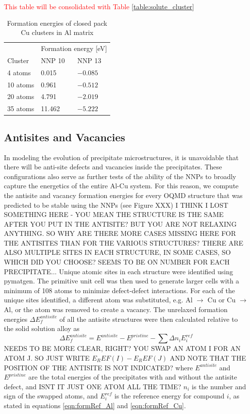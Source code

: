 \documentclass{article}
\begin{document}
\textcolor{red}{This table will be consolidated with Table \ref{table:solute_cluster}}
\begin{table}[H]
 \caption{Formation energies of closed pack Cu clusters in Al matrix}
  \centering
  \begin{tabular}{lll}
    \toprule
    & \multicolumn{2}{c}{Formation energy [eV]}                   \\
    \cmidrule(r){2-3}
    Cluster     & NNP 10     & NNP 13 \\
    \midrule
    4 atoms & 0.015  & $-0.085$     \\
    10 atoms     & 0.961 & $-0.512$      \\
    20 atoms     & 4.791       &  $-2.019$  \\
    35 atoms     & 11.462       &  $-5.222$  \\
    \bottomrule
  \end{tabular}
  \label{tab:cuclust}
\end{table}

\subsection{Antisites and Vacancies} \label{sct:antsite_results}

In modeling the evolution of precipitate microstructures, it is unavoidable that there will be anti-site defects and vacancies inside the precipitates.  These configurations also serve as further tests of the ability of the NNPs to broadly capture the energetics of the entire Al-Cu system.
For this reason, we compute the antisite and vacancy formation energies for every OQMD structure that was predicted to be stable using the NNPs (see Figure XXX) I THINK I LOST SOMETHING HERE - YOU MEAN THE STRUCTURE IS THE SAME AFTER YOU PUT IN THE ANTISITE?  BUT YOU ARE NOT RELAXING ANYTHING. SO WHY ARE THERE MORE CASES MISSING HERE FOR THE ANTISITES THAN FOR THE VARIOUS STRUCTURES?  THERE ARE ALSO MULTIPLE SITES IN EACH STRUCTURE, IN SOME CASES, SO WHICH DID YOU CHOOSE?  SEEMS TO BE ON NUMBER FOR EACH PRECIPITATE...
Unique atomic sites in each structure were identified using pymatgen.
The primitive unit cell was then used to generate larger cells with a minimum of 108 atoms to minimize defect-defect interactions.
For each of the unique sites identified, a different atom was substituted, e.g. Al $\rightarrow$ Cu or Cu $\rightarrow$ Al, or the atom was removed to create a vacancy.  The unrelaxed formation energies $\Delta E^{antisite}_f$ of all the antisite structures were then calculated relative to the solid solution alloy as
\begin{equation}
\Delta E^{antisite}_f = E^{antisite} - E^{pristine} - \sum\Delta n_i E^{ref}_i
\end{equation}
NEEDS TO BE MORE CLEAR, RIGHT? YOU SWAP AN ATOM I FOR AN ATOM J. SO JUST WRITE $E_REF(I)-E_REF(J)$ AND NOTE THAT THE POSITION OF THE ANTISITE IS NOT INDICATED?
where $E^{antisite}$ and $E^{pristine}$ are the total energies of the precipitates with and without the antisite defect, and ISNT IT JUST ONE ATOM ALL THE TIME?  $n_i$ is the
number and sign of the swapped atoms, and $E^{ref}_i$ is the reference energy for compound $i$, as stated in 
equations \ref{eqn:formRef_Al} and \ref{eqn:formRef_Cu}.
\end{document}
